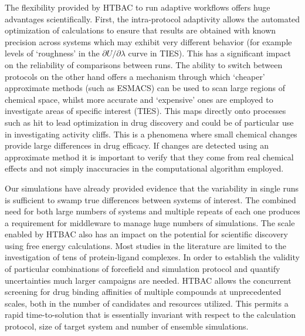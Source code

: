 \documentclass[conference]{IEEEtran}
\begin{document}
The flexibility provided by HTBAC to run adaptive workflows offers huge
advantages scientifically. First, the intra-protocol adaptivity allows the
automated optimization of calculations to ensure that results are obtained
with known precision across systems which may exhibit very different behavior
(for example levels of `roughness' in the $\partial U/\partial\lambda$ curve
in TIES). This has a significant impact on the reliability of comparisons
between runs. The ability to switch between protocols on the other hand offers
a mechanism through which `cheaper' approximate methods (such as ESMACS) can
be used to scan large regions of chemical space, whilst more accurate and
`expensive' ones are employed to investigate areas of specific interest
(TIES). This maps directly onto processes such as hit to lead optimization in
drug discovery and could be of particular use in investigating activity
cliffs. This is a phenomena where small chemical changes provide large
differences in drug efficacy. If changes are detected using an approximate
method it is important to verify that they come from real chemical effects and
not simply inaccuracies in the computational algorithm employed.


Our simulations have already provided
evidence that the variability in single runs is sufficient to swamp true
differences between systems of interest. The combined need for both large
numbers of systems and multiple repeats of each one produces a requirement for
middleware to manage huge numbers of simulations. The scale enabled by HTBAC
also has an impact on the potential for scientific discovery using free energy
calculations. Most studies in the literature are limited to the investigation
of tens of protein-ligand complexes. In order to establish the validity of
particular combinations of forcefield and simulation protocol and quantify
uncertainties much larger campaigns are needed. HTBAC allows the concurrent 
screening for drug binding affinities of multiple compounds at unprecedented 
scales, both in the number of candidates and resources utilized. This permits a 
rapid time-to-solution that is essentially invariant with respect to the 
calculation protocol, size of target system and number of ensemble simulations. 


\end{document}
